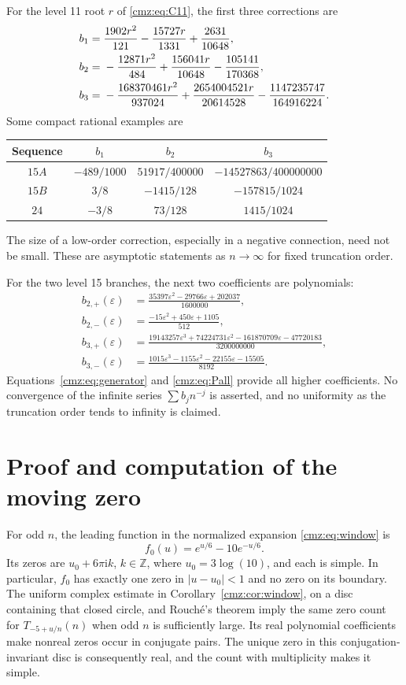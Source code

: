 \documentclass[11pt,letterpaper]{article}
\numberwithin{equation}{section}
\theoremstyle{definition}\newtheorem{definition}[theorem]{Definition}
\theoremstyle{remark}\newtheorem{remark}[theorem]{Remark}
\newcommand{\eps}{\varepsilon}
\newcommand{\ii}{\mathrm i}
\newcommand{\Z}{\mathbb Z}
\begin{document}
For the level 11 root $r$ of \eqref{cmz:eq:C11}, the first three corrections are
\begin{align}
b_1={}&\frac{1902r^2}{121}-\frac{15727r}{1331}+\frac{2631}{10648},\notag\\
b_2={}&-\frac{12871r^2}{484}+\frac{156041r}{10648}-\frac{105141}{170368},\notag\\
b_3={}&-\frac{168370461r^2}{937024}
       +\frac{2654004521r}{20614528}-\frac{1147235747}{164916224}.
\label{cmz:eq:11b123}
\end{align}
Some compact rational examples are
\begin{center}
\renewcommand{\arraystretch}{1.6}
\begin{tabular}{cccc}
\toprule
Sequence & $b_1$ & $b_2$ & $b_3$\\
\midrule
$15A$ & $-489/1000$ & $51917/400000$ & $-14527863/400000000$\\
$15B$ & $3/8$ & $-1415/128$ & $-157815/1024$\\
$24$ & $-3/8$ & $73/128$ & $1415/1024$\\
\bottomrule
\end{tabular}
\end{center}
The size of a low-order correction, especially in a negative connection, need not be small. These are asymptotic statements as $n\to\infty$ for fixed truncation order.

For the two level 15 branches, the next two coefficients are polynomials:
\begin{align}
b_{2,+}(\eps)&=\frac{35397\eps^2-29766\eps+202037}{1600000},\label{cmz:eq:b2p}\\
b_{2,-}(\eps)&=\frac{-15\eps^2+450\eps+1105}{512},\label{cmz:eq:b2m}\\
b_{3,+}(\eps)&=\frac{19143257\eps^3+74224731\eps^2
                         -161870709\eps-47720183}{3200000000},\label{cmz:eq:b3p}\\
b_{3,-}(\eps)&=\frac{1015\eps^3-1155\eps^2-22155\eps-15505}{8192}.
\label{cmz:eq:b3m}
\end{align}
Equations~\eqref{cmz:eq:generator} and \eqref{cmz:eq:Pall} provide all higher coefficients. No convergence of the infinite series $\sum b_jn^{-j}$ is asserted, and no uniformity as the truncation order tends to infinity is claimed.

\section{Proof and computation of the moving zero}
\label{cmz:sec:zeroproof}
For odd $n$, the leading function in the normalized expansion \eqref{cmz:eq:window} is
\[
f_0(u)=e^{u/6}-10e^{-u/6}.
\]
Its zeros are $u_0+6\pi\ii k$, $k\in\Z$, where $u_0=3\log(10)$, and each is simple. In particular, $f_0$ has exactly one zero in $|u-u_0|<1$ and no zero on its boundary. The uniform complex estimate in Corollary~\ref{cmz:cor:window}, on a disc containing that closed circle, and Rouch\'e's theorem imply the same zero count for $T_{-5+u/n}(n)$ when odd $n$ is sufficiently large. Its real polynomial coefficients make nonreal zeros occur in conjugate pairs. The unique zero in this conjugation-invariant disc is consequently real, and the count with multiplicity makes it simple.
\end{document}
